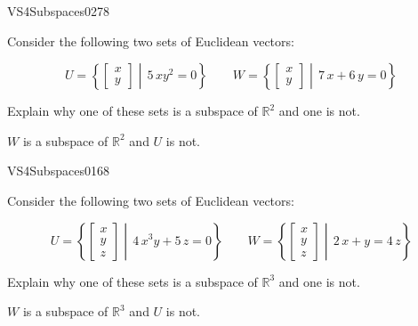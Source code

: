 \begin{exercise}{VS4}{Subspaces}{0278} 
\begin{exerciseStatement} 

Consider the following two sets of Euclidean vectors: 

 \[
          U=\left\{ \left[\begin{array}{c}
x \\
y
\end{array}\right] \middle|\,5 \, x y^{2} = 0\right\} \hspace{2em}  W=\left\{ \left[\begin{array}{c}
x \\
y
\end{array}\right] \middle|\,7 \, x + 6 \, y = 0\right\}
    \] 

 Explain why one of these sets is a subspace of \(\mathbb{R}^2\) and one is not. 

 \end{exerciseStatement}
 \begin{exerciseAnswer} 

\(W\) is a subspace of \(\mathbb{R}^2\) and \(U\) is not.

 \end{exerciseAnswer}
 \end{exercise}


\newpage




\begin{exercise}{VS4}{Subspaces}{0168} 
\begin{exerciseStatement} 

Consider the following two sets of Euclidean vectors: 

 \[
          U=\left\{ \left[\begin{array}{c}
x \\
y \\
z
\end{array}\right] \middle|\,4 \, x^{3} y + 5 \, z = 0\right\} \hspace{2em}  W=\left\{ \left[\begin{array}{c}
x \\
y \\
z
\end{array}\right] \middle|\,2 \, x + y = 4 \, z\right\}
    \] 

 Explain why one of these sets is a subspace of \(\mathbb{R}^3\) and one is not. 

 \end{exerciseStatement}
 \begin{exerciseAnswer} 

\(W\) is a subspace of \(\mathbb{R}^3\) and \(U\) is not.

 \end{exerciseAnswer}
 \end{exercise}



